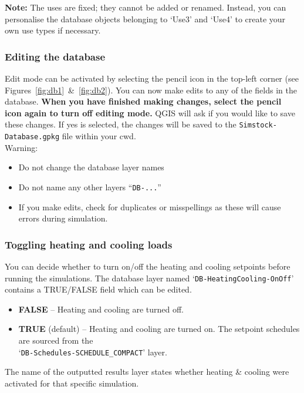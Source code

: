 \documentclass{article}
\begin{document}
\textbf{Note:} The uses are fixed; they cannot be added or renamed. Instead, you can personalise the database objects belonging to `Use3' and `Use4' to create your own use types if necessary.

\subsubsection{Editing the database}
\label{section:editingdb}
Edit mode can be activated by selecting the pencil icon in the top-left corner (see Figures~\ref{fig:db1}~\&~\ref{fig:db2}). You can now make edits to any of the fields in the database. \textbf{When you have finished making changes, select the pencil icon again to turn off editing mode.} QGIS will ask if you would like to save these changes. If yes is selected, the changes will be saved to the \texttt{Simstock-Database.gpkg} file within your cwd. \\

Warning:
\begin{itemize}
    \item Do not change the database layer names
    \item Do not name any other layers ``\texttt{DB-...}''
    \item If you make edits, check for duplicates or misspellings as these will cause errors during simulation.
\end{itemize}

\subsubsection{Toggling heating and cooling loads}
\label{section:heatingcoolingtoggle}
You can decide whether to turn on/off the heating and cooling setpoints before running the simulations. The database layer named `\texttt{DB-HeatingCooling-OnOff}' contains a TRUE/FALSE field which can be edited.
\begin{itemize}
    \item \textbf{FALSE} -- Heating and cooling are turned off.%
    \item \textbf{TRUE} (default) -- Heating and cooling are turned on. The setpoint schedules are sourced from the \\
    `\texttt{DB-Schedules-SCHEDULE\_COMPACT}' layer.
\end{itemize}

The name of the outputted results layer states whether heating \& cooling were activated for that specific simulation.
\end{document}

